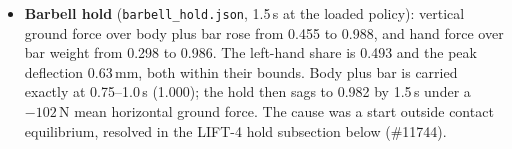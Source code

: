 \documentclass[11pt,a4paper]{article}
\begin{document}
\begin{itemize}[nosep]
  back-rack hold seed, resolved in the next subsection). The \#13093 marker gate (RMS $<2$\,cm, maximum $<4$\,cm) therefore
  stays open. Pelvis residuals fell from 316.7\,N and 688.5\,N\,m to
  214.8\,N and 546.4\,N\,m, but stay above the Hicks et al.\ limits of 5\,\%
  of peak external force (167.2\,N) and 1\,\% of it times the centre-of-mass
  height (21.9\,N\,m). The cause is the same: the hand loads act at a grip the
  model's hands do not reach. The OpenSim static hold carries body plus bar
  exactly (1961.33\,N).
\item \textbf{Barbell hold} (\texttt{barbell\_hold.json}, 1.5\,s at the
  loaded policy): vertical ground force over body plus bar rose from 0.455
  to 0.988, and hand force over bar weight from 0.298 to 0.986. The left-hand
  share is 0.493 and the peak deflection 0.63\,mm, both within their bounds.
  Body plus bar is carried exactly at 0.75--1.0\,s (1.000); the hold then
  sags to 0.982 by 1.5\,s under a $-102$\,N mean horizontal ground force.
  The cause was a start outside contact equilibrium, resolved in the
  LIFT-4 hold subsection below (\#11744).
\end{itemize}
\end{document}
